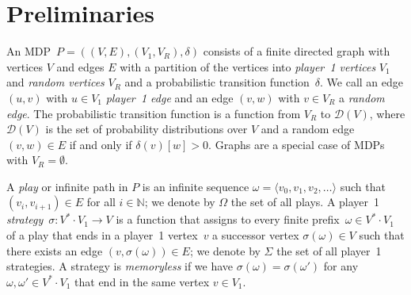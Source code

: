 \documentclass[11pt,letterpaper]{article}
\newcommand{\lu}{\textup{(}}
\newcommand{\ru}{\textup{)}\xspace}
\newcommand{\upbr}[1]{\lu #1\ru}
\newcommand{\pat}{\omega\xspace}
\newcommand{\Path}{\Omega\xspace}
\newcommand{\str}{\sigma\xspace}
\newcommand{\Str}{\Sigma\xspace}
\newcommand{\mdp}{P\xspace}
\newcommand{\vo}{V_1\xspace}
\newcommand{\vr}{V_R\xspace}
\newcommand{\trans}{\delta\xspace}
\newcommand{\ec}{X\xspace}
\newif\iffullversion
\newcommand{\infull}[1]{\iffullversion #1\fi}
\begin{document}
\section{Preliminaries}\label{sec:prelim}
\smallskip\noindent{\em Markov Decision Processes \upbr{MDPs} and Graphs.} 
An MDP~$\mdp = ((V, E), \allowbreak(\vo, \vr), \allowbreak\trans)$ consists of a finite directed 
graph with vertices $V$ and edges $E$ with a partition of the vertices into 
\emph{player~1 vertices} $\vo$ and \emph{random vertices} $\vr$ and a 
probabilistic transition function~$\trans$. We call an edge $(u,v)$ with $u \in \vo$
\emph{player~1 edge} and an edge $(v, w)$ with $v \in \vr$ a \emph{random edge}.
The probabilistic transition function is a function from $\vr$ to $\mathcal{D}(V)$, 
where $\mathcal{D}(V)$ is the set of probability distributions over $V$ and 
a random edge $(v, w) \in E$ if and only if $\trans(v)[w] > 0$.\infull{ For the purpose
of this paper we assume for simplicity that, for each random vertex $v$, 
$\trans(v)[w]$ is the uniform distribution over all $w \in V$ with $(v, w) \in E$; this is w.l.o.g.\ as we are only ask whether a probability is zero or one 
(qualitative analysis) or zero or larger than zero.} Graphs are a special case
of MDPs with $\vr = \emptyset$.
\infull{

\smallskip\noindent{\em Sub-MDPs and Maximal End-Components.}
A sub-MDP of an MDP $\mdp$ induced by a vertex set $\ec\infull{ \subseteq V}$ 
is defined as $\mdp[\ec] = ((\ec, E \cap (\ec \times \ec), (\vo \cap \ec, 
\vr \cap \ec), \trans')$, where $\trans': \ec \rightarrow \mathcal{D}(\ec)$ 
is for each $v \in \vr \cap \ec$ the uniform distribution over all $w \in \ec$ 
with $(v, w) \in E$.
An \emph{end-component} \upbr{EC} of an MDP $\mdp$ is a set of 
vertices $\ec\infull{ \subseteq V}$ such that \upbr{a} the induced sub-MDP 
$\mdp[\ec]$
is strongly connected, \upbr{b} all outgoing edges in $E$ of vertices in 
$\ec \cap \vr$ are contained in $\mdp[\ec]$, and \upbr{c} $\mdp[\ec]$ contains at least one edge.
An end-component is a \emph{maximal end-component} \upbr{MEC} if it is maximal 
under set inclusion.
An end-component is \emph{trivial} if it consists of a single vertex \upbr{with
a self-loop}, otherwise it is \emph{non-trivial}.
The \emph{MEC-decomposition} of an MDP consists of all MECs of the MDP and the 
set of vertices that do not belong to any MEC.
}

\smallskip{} 
A \emph{play} or infinite path in $\mdp$ is an infinite sequence $\pat = \langle v_0, 
v_1, v_2, \ldots \rangle$ such that $(v_i, v_{i+1}) \in E$ for all $i \in \mathbb{N}$;
we denote by $\Path$ the set of all plays.
A player~1 \emph{strategy}~$\str: V^* \cdot \vo \rightarrow V$ is a function that 
assigns to every finite prefix~$\pat \in V^* \cdot \vo$ of a play that ends in a 
player~1 vertex~$v$ a successor vertex $\str(\pat) \in V$ such that 
there exists an edge $(v, \str(\pat)) \in E$; we denote by $\Str$ the 
set of all player~1 strategies. A strategy is \emph{memoryless} if we have 
$\str(\pat) = \str(\pat')$ for any $\pat, \pat' \in V^* \cdot \vo$ that 
end in the same vertex $v \in \vo$.
\end{document}
